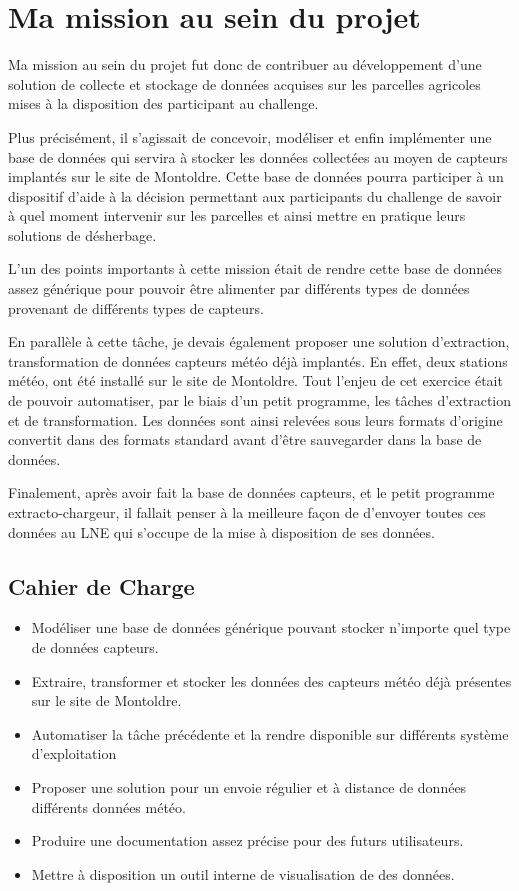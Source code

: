 \section{Ma mission au sein du projet}
Ma mission au sein du projet fut donc de contribuer au développement d’une solution de collecte et stockage de données acquises sur les parcelles agricoles mises à la disposition des participant au challenge. 

Plus précisément, il s’agissait de concevoir, modéliser et enfin implémenter une base de données qui servira à stocker les données collectées au moyen de capteurs implantés sur le site de Montoldre. Cette base de données pourra participer à un dispositif d’aide à la décision permettant aux participants du challenge de savoir à quel moment intervenir sur les parcelles et ainsi mettre en pratique leurs solutions de désherbage.  

L’un des points importants à cette mission était de rendre cette base de données assez générique pour pouvoir être alimenter par différents types de données provenant de différents types de capteurs. 

En parallèle à cette tâche, je devais également proposer une solution d’extraction, transformation de données capteurs météo déjà implantés. En effet, deux stations météo, ont été installé sur le site de Montoldre. Tout l’enjeu de cet exercice était de pouvoir automatiser, par le biais d’un petit programme, les tâches d’extraction et de transformation. Les données sont ainsi relevées sous leurs formats d’origine convertit dans des formats standard avant d’être sauvegarder dans la base de données. 

Finalement, après avoir fait la base de données capteurs, et le petit programme extracto-chargeur, il fallait penser à la meilleure façon de d’envoyer toutes ces données au LNE qui s’occupe de la mise à disposition de ses données. 

 
\subsection{Cahier de Charge}
 \begin{itemize}
      \item Modéliser une base de données générique pouvant stocker n’importe quel type de données capteurs. 
     \item Extraire, transformer et stocker les données des capteurs météo déjà présentes sur le site de Montoldre.
     \item Automatiser la tâche précédente et la rendre disponible sur différents système d’exploitation 
     \item Proposer une solution pour un envoie régulier et à distance de données différents données météo. 
     \item Produire une documentation assez précise pour des futurs utilisateurs. 
     \item Mettre à disposition un outil interne de visualisation de des données. 
 \end{itemize}

